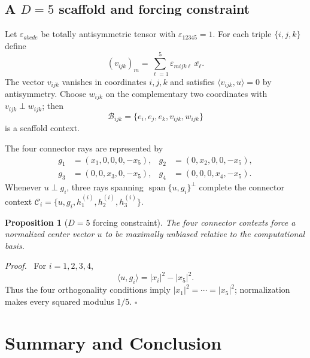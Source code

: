 \documentclass[%
  reprint,
  superscriptaddress,
  showpacs,
  showkeys,
  amsmath,amssymb,
  pra,
  longbibliography,
  floatfix,
  x11names
]{revtex4-2}
\newenvironment{revision}{\begingroup\color{revisionblue}}{\endgroup}
\newtheorem{proposition}{Proposition}
\newenvironment{proof}{\par\noindent\textit{Proof.}\ }{\hfill$\square$\par}
\begin{document}
\begin{revision}
\subsection{A $D=5$ scaffold and forcing constraint}

Let $\varepsilon_{abcde}$ be totally antisymmetric  tensor %
with $\varepsilon_{12345}=1$.  For each triple $\{i,j,k\}$ define
\[
(v_{ijk})_m=\sum_{\ell=1}^5\varepsilon_{mijk\ell}\,\overline{x_\ell}.
\]
The vector $v_{ijk}$ vanishes in coordinates $i,j,k$ and satisfies $\langle v_{ijk},u\rangle=0$ by antisymmetry.  Choose $w_{ijk}$ on the complementary two coordinates with $v_{ijk}\perp w_{ijk}$; then
\[
\mathcal{B}_{ijk}=\{e_i,e_j,e_k,v_{ijk},w_{ijk}\}
\]
is a scaffold context.

The four connector rays are represented by
\begin{align*}
g_1&=(x_1,0,0,0,-x_5),&
g_2&=(0,x_2,0,0,-x_5),\\
g_3&=(0,0,x_3,0,-x_5),&
g_4&=(0,0,0,x_4,-x_5).
\end{align*}
Whenever $u\perp g_i$, three rays spanning $\operatorname{span}\{u,g_i\}^{\perp}$ complete the connector context $\mathcal{C}_i=\{u,g_i,h^{(i)}_1,h^{(i)}_2,h^{(i)}_3\}$.

\begin{proposition}[$D=5$ forcing constraint]
\label{prop:D5forcing}
The four connector contexts force a normalized center vector $u$ to be maximally unbiased relative to the computational basis.
\end{proposition}

\begin{proof}
For $i=1,2,3,4$,
\[
\langle u,g_i\rangle=|x_i|^2-|x_5|^2.
\]
Thus the four orthogonality conditions imply $|x_1|^2=\cdots=|x_5|^2$; %
normalization makes every squared modulus $1/5$.
\end{proof}
\end{revision}

\section{Summary and Conclusion}

\end{document}
